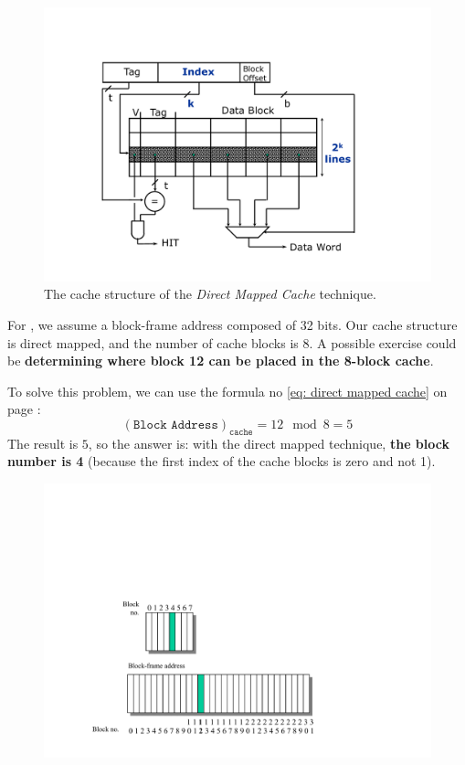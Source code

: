 \newpage

\begin{figure}[!htp]
    \centering
    \includegraphics[width=.7\textwidth]{img/direct-mapped-cache-2.pdf}
    \caption{The cache structure of the \emph{Direct Mapped Cache} technique.}
    \label{fig: Direct Mapped Cache - Structure}
\end{figure}

\noindent
For , we assume a block-frame address composed of 32 bits. Our cache structure is direct mapped, and the number of cache blocks is 8. A possible exercise could be \textbf{determining where block 12 can be placed in the 8-block cache}.

\highspace
To solve this problem, we can use the formula no \ref{eq: direct mapped cache} on page \pageref{eq: direct mapped cache}: 
\begin{equation*}
    \left(\texttt{Block Address}\right)_{\texttt{cache}} = 12 \mod 8 = 5
\end{equation*}
The result is $5$, so the answer is: with the direct mapped technique, \textbf{the block number is 4} (because the first index of the cache blocks is zero and not 1).

\begin{figure}[!htp]
    \centering
    \includegraphics[width=.8\textwidth]{img/direct-mapped-cache-3.pdf}
\end{figure}

